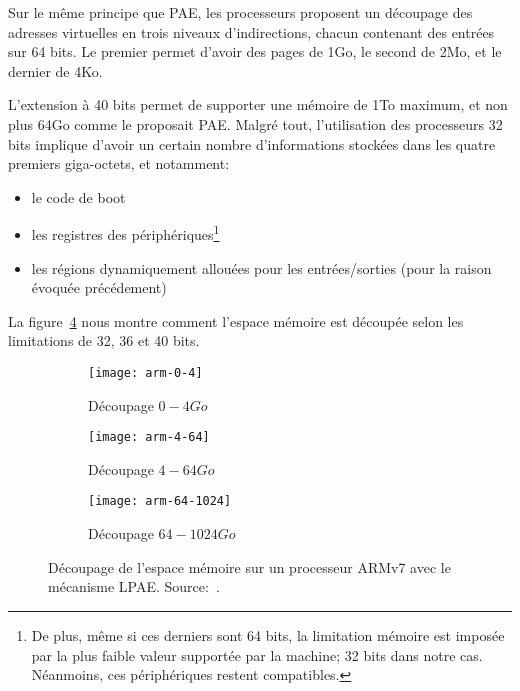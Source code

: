     Sur le même principe que PAE, les processeurs proposent un découpage des
    adresses virtuelles en trois niveaux d'indirections, chacun contenant des
    entrées sur 64 bits. Le premier permet d'avoir des pages de 1Go, le second
    de 2Mo, et le dernier de 4Ko.

    L'extension à 40 bits permet de supporter une mémoire de 1To maximum, et non
    plus 64Go comme le proposait PAE. Malgré tout, l'utilisation des processeurs
    32 bits implique d'avoir un certain nombre d'informations stockées dans les
    quatre premiers giga-octets, et notamment:

    \begin{itemize}
      \item le code de boot
      \item les registres des périphériques\footnote{De plus, même si ces
        derniers sont 64 bits, la limitation mémoire est imposée par la plus
        faible valeur supportée par la machine; 32 bits dans notre
        cas. Néanmoins, ces périphériques restent compatibles.}
      \item les régions dynamiquement allouées pour les entrées/sorties (pour la
        raison évoquée précédement)
    \end{itemize}

    La figure~\ref{fig:arm-0-1024} nous montre comment l'espace mémoire est
    découpée selon les limitations de 32, 36 et 40 bits.

    \begin{figure}[h]
      \begin{subfigure}[b]{0.37\textwidth}
        \texttt{[image: arm-0-4]}
        \caption{Découpage $0-4Go$}
        \label{fig:arm-0-4}
      \end{subfigure}
      \begin{subfigure}[b]{0.37\textwidth}
        \texttt{[image: arm-4-64]}
        \caption{Découpage $4-64Go$}
        \label{fig:arm-4-64}
      \end{subfigure}
      \begin{subfigure}[b]{0.23\textwidth}
        \texttt{[image: arm-64-1024]}
        \caption{Découpage $64-1024Go$}
        \label{fig:arm-64-1024}
      \end{subfigure}
      \caption{Découpage de l'espace mémoire sur un processeur ARMv7 avec le
        mécanisme LPAE. Source:~\citeauthor{arm2012principles}.}
      \label{fig:arm-0-1024}
    \end{figure}

